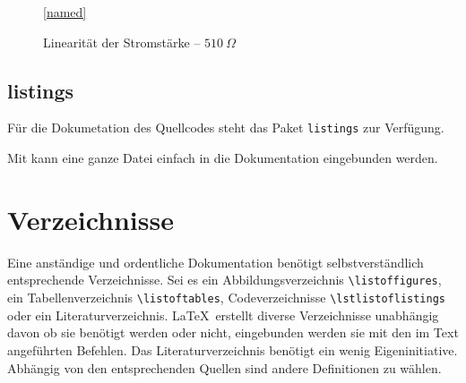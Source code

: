 \begin{figure}[H]
	\centering
	\ref{named}
	\caption{Linearität der Stromstärke -- $510~\Omega$}
\end{figure}

\subsection*{listings}
Für die Dokumetation des Quellcodes steht das Paket \verb|listings| zur Verfügung.

Mit \verb|| kann eine ganze Datei einfach in die Dokumentation eingebunden werden.

\begin{codeblock}
	
\end{codeblock}

\section{Verzeichnisse}
Eine anständige und ordentliche Dokumentation benötigt selbstverständlich entsprechende Verzeichnisse. Sei es ein Abbildungsverzeichnis \verb|\listoffigures|, ein Tabellenverzeichnis \verb|\listoftables|, Codeverzeichnisse \verb|\lstlistoflistings| oder ein Literaturverzeichnis. \LaTeX~erstellt diverse Verzeichnisse unabhängig davon ob sie benötigt werden oder nicht, eingebunden werden sie mit den im Text angeführten Befehlen. Das Literaturverzeichnis benötigt ein wenig Eigeninitiative. Abhängig von den entsprechenden Quellen sind andere Definitionen zu wählen.